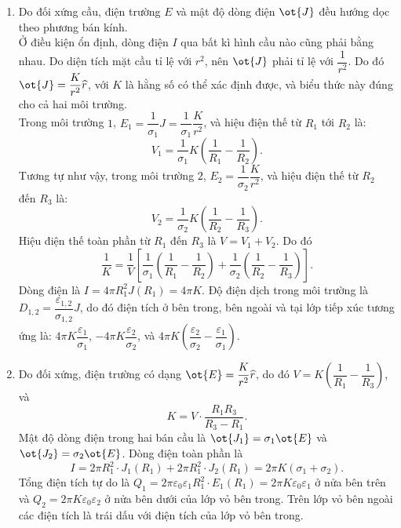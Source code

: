 \begin{loigiai}
\begin{enumerate}[1)]
    \item Do đối xứng cầu, điện trường $E$ và mật độ dòng điện $\ot{J}$ đều hướng dọc theo phương bán kính.\\
    Ở điều kiện ổn định, dòng điện $I$ qua bất kì hình cầu nào cũng phải bằng nhau. Do diện tích mặt cầu tỉ lệ với $r^2$, nên $\ot{J}$ phải tỉ lệ với $\dfrac{1}{r^2}$. Do đó $\ot{J}=\dfrac{K}{r^2}\widehat{r}$, với $K$ là hằng số có thể xác định được, và biểu thức này đúng cho cả hai môi trường.\\
    Trong môi trường $1$, $E_1=\dfrac{1}{\sigma_1}J=\dfrac{1}{\sigma_1}\dfrac{K}{r^2}$, và hiệu điện thế từ $R_1$ tới $R_2$ là:
    \[V_1=\dfrac{1}{\sigma_1}K\left(\dfrac{1}{R_1}-\dfrac{1}{R_2}\right).\]
    Tương tự như vậy, trong môi trường $2$, $E_2=\dfrac{1}{\sigma_2}\dfrac{K}{r^2}$, và hiệu điện thế từ $R_2$ đến $R_3$ là:
    \[V_2=\dfrac{1}{\sigma_2}K\left(\dfrac{1}{R_2}-\dfrac{1}{R_3}\right).\]
    Hiệu điện thế toàn phần từ $R_1$ đến $R_3$ là $V=V_1+V_2$.
    Do đó
    \[\dfrac{1}{K}=\dfrac{1}{V}\left[\dfrac{1}{\sigma_1}\left(\dfrac{1}{R_1}-\dfrac{1}{R_2}\right)+\dfrac{1}{\sigma_2}\left(\dfrac{1}{R_2}-\dfrac{1}{R_3}\right)\right].\]
    Dòng điện là $I=4\pi R_1^2J(R_1)=4\pi K$.
    Độ điện dịch trong môi trường là $D_{1,2}=\dfrac{\varepsilon_{1,2}}{\sigma_{1,2}}J$, do đó điện tích ở bên trong, bên ngoài và tại lớp tiếp xúc tương ứng là: $4\pi K\dfrac{\varepsilon_1}{\sigma_1}$, $-4\pi K\dfrac{\varepsilon_2}{\sigma_2}$, và $4\pi K\left(\dfrac{\varepsilon_2}{\sigma_2}-\dfrac{\varepsilon_1}{\sigma_1}\right)$.
    \item Do đối xứng, điện trường có dạng $\ot{E}=\dfrac{K}{r^2}\widehat{r}$, do đó $V=K\left(\dfrac{1}{R_1}-\dfrac{1}{R_3}\right)$, và
    \[K=V\cdot\dfrac{R_1R_3}{R_3-R_1}.\]
    Mật độ dòng điện trong hai bán cầu là $\ot{J_1}=\sigma_1\ot{E}$ và $\ot{J_2}=\sigma_2\ot{E}$. Dòng điện toàn phần là
    \[I=2\pi R_1^2\cdot J_1(R_1)+2\pi R_1^2\cdot J_2(R_1)=2\pi K(\sigma_1+\sigma_2).\]
    Tổng điện tích tự do là $Q_1=2\pi\varepsilon_0\varepsilon_1R_1^2\cdot E_1(R_1)=2\pi K\varepsilon_0\varepsilon_1$ ở nửa bên trên và $Q_2=2\pi K\varepsilon_0\varepsilon_2$ ở nửa bên dưới của lớp vỏ bên trong. Trên lớp vỏ bên ngoài các điện tích là trái dấu với điện tích của lớp vỏ bên trong. 
\end{enumerate}
\end{loigiai}




